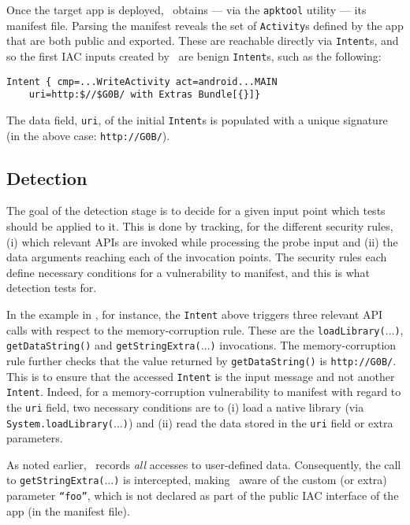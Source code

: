 Once the target app is deployed, \Tool\ obtains --- via the {\tt apktool} utility --- its manifest file. Parsing the manifest reveals the set of {\tt Activity}s defined by the app that are both public and exported. These are reachable directly via {\tt Intent}s, and so the first IAC inputs created by \Tool\ are benign {\tt Intent}s, such as the following:
\begin{lstlisting}[numbers=none]
Intent { cmp=...WriteActivity act=android...MAIN 
	uri=http:$//$G0B/ with Extras Bundle[{}]}
\end{lstlisting}
The data field, {\tt uri}, of the initial {\tt Intent}s is populated with a unique signature (in the above case: {\tt http://G0B/}).

\subsection{Detection}\label{Se:detectionSubsec}

The goal of the detection stage is to decide for a given input point which tests should be applied to it. This is done by tracking, for the different security rules, (i) which relevant APIs are invoked while processing the probe input and (ii) the data arguments reaching each of the invocation points. The security rules each define necessary conditions for a vulnerability to manifest, and this is what detection tests for.

In the example in , for instance, the {\tt Intent} above triggers three relevant API calls with respect to the memory-corruption rule. These are the {\tt loadLibrary($\ldots$)}, {\tt getDataString()} and {\tt getStringExtra($\ldots$)} invocations. The memory-corruption rule further checks that the value returned by {\tt getDataString()} is {\tt http://G0B/}. This is to ensure that the accessed {\tt Intent} is the input message and not another {\tt Intent}. Indeed, for a memory-corruption vulnerability to manifest with regard to the {\tt uri} field, two necessary conditions are to (i) load a native library (via {\tt System.loadLibrary($\ldots$)}) and (ii) read the data stored in the {\tt uri} field or extra parameters.

As noted earlier, \Tool\ records \emph{all} accesses to user-defined data. Consequently, the call to {\tt getStringExtra($\ldots$)} is intercepted, making \Tool\ aware of the custom (or extra) parameter {\tt ``foo''}, which is not declared as part of the public IAC interface of the app (in the manifest file).

